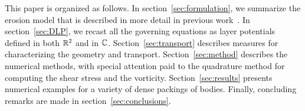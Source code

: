 \documentclass{jfm}
\begin{document}
This paper is organized as follows. In section~\ref{sec:formulation}, we
summarize the erosion model that is described in more detail in previous
work~\citep{qua-moo2018}.  In section~\ref{sec:DLP}, we recast all the
governing equations as layer potentials defined in both ${\mathbb{R}}^2$ and in
${\mathbb{C}}$.  Section~\ref{sec:transport} describes measures for
characterizing the geometry and transport. Section~\ref{sec:method}
describes the numerical methods, with special attention paid to the
quadrature method for computing the shear stress and the vorticity.
Section~\ref{sec:results} presents numerical examples for a variety of
dense packings of bodies.  Finally, concluding remarks are made in
section~\ref{sec:conclusions}.

\end{document}
